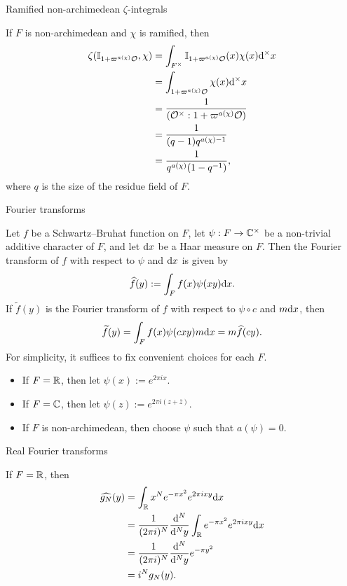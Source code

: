 \begin{frame}{Ramified non-archimedean $ \zeta $-integrals}

If $ F $ is non-archimedean and $ \chi $ is ramified, then
\begin{align*}
\zeta(\mathbb{I}_{1 + \varpi^{a(\chi)}\mathcal{O}}, \chi)
& = \int_{F^\times} \mathbb{I}_{1 + \varpi^{a(\chi)}\mathcal{O}}(x)\chi(x)\mathrm{d}^\times x \\
& = \int_{1 + \varpi^{a(\chi)}\mathcal{O}} \chi(x)\mathrm{d}^\times x \\
& = \dfrac{1}{(\mathcal{O}^\times : 1 + \varpi^{a(\chi)}\mathcal{O})} \\
& = \dfrac{1}{(q - 1)q^{a(\chi) - 1}} \\
& = \dfrac{1}{q^{a(\chi)}(1 - q^{-1})},
\end{align*}
where $ q $ is the size of the residue field of $ F $.

\end{frame}

\begin{frame}{Fourier transforms}

Let $ f $ be a Schwartz--Bruhat function on $ F $, let $ \psi : F \to \mathbb{C}^\times $ be a non-trivial additive character of $ F $, and let $ \mathrm{d} x $ be a Haar measure on $ F $. Then the Fourier transform of $ f $ with respect to $ \psi $ and $ \mathrm{d} x $ is given by
$$ \widehat{f}(y) := \int_F f(x)\psi(xy)\mathrm{d} x. $$
If $ \widetilde{f}(y) $ is the Fourier transform of $ f $ with respect to $ \psi \circ c $ and $ m\mathrm{d} x $, then
$$ \widetilde{f}(y) = \int_F f(x)\psi(cxy)m\mathrm{d} x = m\widehat{f}(cy). $$
For simplicity, it suffices to fix convenient choices for each $ F $.
\begin{itemize}
\item If $ F = \mathbb{R} $, then let $ \psi(x) := e^{2\pi i x} $.
\item If $ F = \mathbb{C} $, then let $ \psi(z) := e^{2\pi i(z + \overline{z})} $.
\item If $ F $ is non-archimedean, then choose $ \psi $ such that $ a(\psi) = 0 $.
\end{itemize}

\end{frame}

\begin{frame}{Real Fourier transforms}

If $ F = \mathbb{R} $, then
\begin{align*}
\widehat{g_N}(y)
& = \int_{\mathbb{R}} x^Ne^{-\pi x^2}e^{2\pi ixy}\mathrm{d} x \\
& = \dfrac{1}{(2\pi i)^N}\dfrac{\mathrm{d}^N}{\mathrm{d}^Ny}\int_{\mathbb{R}} e^{-\pi x^2}e^{2\pi i xy}\mathrm{d} x \\
& = \dfrac{1}{(2\pi i)^N}\dfrac{\mathrm{d}^N}{\mathrm{d}^Ny}e^{-\pi y^2} \\
& = i^Ng_N(y).
\end{align*}

\end{frame}

